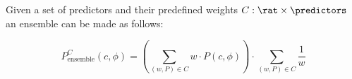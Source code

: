 \begin{definition}
  Given a set of predictors and their predefined weights $C : \rat \times \predictors$ an ensemble can be made as follows:

  \[
    P_{\text{ensemble}}^C(c, \phi) =
      \left( \sum_{(w, P) \in C} w \cdot P(c, \phi) \right)
      \cdot \sum_{(w, P) \in C} \frac{1}{w}
  \]
\end{definition}
